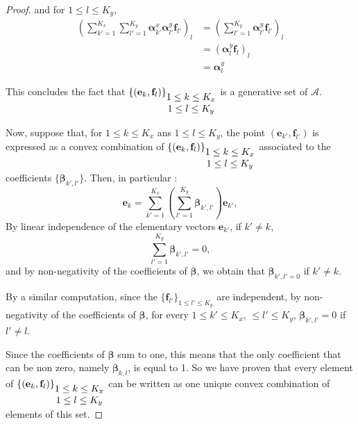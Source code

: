 \documentclass[10pt,a4paper]{amsart}
\def\aalpha{\boldsymbol{\alpha}}
\def\bbeta{\boldsymbol{\beta}}
\def\cA{\mathcal{A}}
\def\ee{\mathbf{e}}
\def\ff{\mathbf{f}}
\begin{document}
\begin{proof}
and for $1 \leq l \leq K_y$, 
\begin{equation}
    \begin{array}{ll}
       \displaystyle{}   \left(\sum_{k' = 1}^{K_x} \sum_{l' = 1}^{K_y} \aalpha_{k'}^x \aalpha_{l'}^y  \ff_{l'}\right)_{l} & = 
        \displaystyle{}  \left(\sum_{l' = 1}^{K_y} \aalpha_{l'}^y \ff_{l'} \right)_{l}\\
         &\displaystyle{} = ( \aalpha_{l}^y \ff_{l})_{l} \\
         &\displaystyle{} = \aalpha^y_{l}
    \end{array}
\end{equation}

This concludes the fact that $\left\lbrace \left( \ee_{k}, \ff_{l}\right) \right\rbrace_{\footnotesize \begin{matrix} 1 \leq k \leq K_x \\ 1\leq l \leq K_y \end{matrix}}$ is a generative set of $\cA$.

Now, suppose that, for $1\leq k \leq K_x$ ans $1\leq l \leq K_y$, the point $\displaystyle{} (\ee_{k'}, \ff_{l'})$ is expressed as a convex combination of $\left\lbrace \left( \ee_{k}, \ff_{l}\right) \right\rbrace_{\footnotesize \begin{matrix} 1 \leq k \leq K_x \\ 1\leq l \leq K_y \end{matrix}}$ associated to the coefficients $\{ \bbeta_{k', l'}\}$. Then, in particular :
%
\begin{equation}
    \ee_{k} = \sum_{k' =1}^{K_x} \left( \sum_{l' =1}^{K_y} \bbeta_{k', l'} \right) \ee_{k'},
\end{equation}
%
By linear independence of the elementary vectors $\ee_{k'}$, if $k' \neq k$,
%
 \begin{equation}
     \sum_{l' = 1}^{K_y} \bbeta_{k', l'} = 0,
 \end{equation}
and by non-negativity of the coefficients of $\bbeta$, we obtain that $\bbeta_{k', l' = 0}$ if $k' \neq k$.

By a similar computation, since the $\{\ff_{l'}\}_{1 \leq l'\leq K_y}$ are independent, by non-negativity of the coefficients of $\bbeta$, for every $1\leq k' \leq K_x$, $\leq l' \leq K_y$, $\bbeta_{k', l'} = 0$ if $l' \neq l$. 

Since the coefficients of $\bbeta$ sum to one, this means that the only coefficient that can be non zero, namely $\bbeta_{k,l}$, is equal to 1. So we have proven that every  element of $\left\lbrace \left( \ee_{k}, \ff_{l}\right) \right\rbrace_{\footnotesize \begin{matrix} 1 \leq k \leq K_x \\ 1\leq l \leq K_y \end{matrix}}$ can be written as one unique convex combination of elements of this set.
\end{proof}
\end{document}
